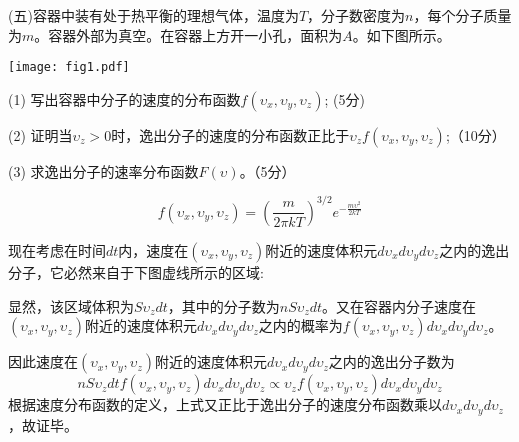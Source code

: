 \documentclass[CJK]{beamer}
\begin{document}
\begin{frame}
\bch
{\blue(五)容器中装有处于热平衡的理想气体，温度为$T$，分子数密度为$n$，每个分子质量为$m$。容器外部为真空。在容器上方开一小孔，面积为$A$。如下图所示。
\begin{center}
\texttt{[image: fig1.pdf]}
\end{center}
\bitem
\item[(1)]{ \blue 写出容器中分子的速度的分布函数$f(\upsilon_x, \upsilon_y, \upsilon_z)$; (5分)}
\item[(2)]{\blue 证明当$\upsilon_z>0$时，逸出分子的速度的分布函数正比于$\upsilon_z f(\upsilon_x, \upsilon_y, \upsilon_z)$;（10分）}
\item[(3)]{\blue 求逸出分子的速率分布函数$F(\upsilon)$。（5分）}
\eitem
}
\ech
\end{frame}

\begin{frame}
\bch
{\darkgreen

$$f(\upsilon_x, \upsilon_y, \upsilon_z) = \left(\frac{m}{2\pi kT}\right)^{3/2} e^{-\frac{m\upsilon^2}{2kT}}$$
}
\ech
\end{frame}


\begin{frame}
\bch
{\small \darkgreen
现在考虑在时间$dt$内，速度在$(\upsilon_x, \upsilon_y, \upsilon_z)$附近的速度体积元$d\upsilon_x d\upsilon_y d\upsilon_z$之内的逸出分子，它必然来自于下图虚线所示的区域:}

\emini
{}
{\darkgreen \small
显然，该区域体积为$S \upsilon_z dt$，其中的分子数为$nS \upsilon_z dt$。又在容器内分子速度在$(\upsilon_x, \upsilon_y, \upsilon_z)$附近的速度体积元$d\upsilon_x d\upsilon_y d\upsilon_z$之内的概率为$f(\upsilon_x, \upsilon_y, \upsilon_z)d\upsilon_x d\upsilon_y d\upsilon_z$。
}
\emini

{\darkgreen \small
因此速度在$(\upsilon_x, \upsilon_y, \upsilon_z)$附近的速度体积元$d\upsilon_x d\upsilon_y d\upsilon_z$之内的逸出分子数为
$$ nS \upsilon_z dt f(\upsilon_x, \upsilon_y, \upsilon_z)d\upsilon_x d\upsilon_y d\upsilon_z \propto \upsilon_z f(\upsilon_x, \upsilon_y, \upsilon_z) d\upsilon_x d\upsilon_y d\upsilon_z $$
根据速度分布函数的定义，上式又正比于逸出分子的速度分布函数乘以$d\upsilon_x d\upsilon_y d\upsilon_z$，故证毕。
}

\ech
\end{frame}
\end{document}
